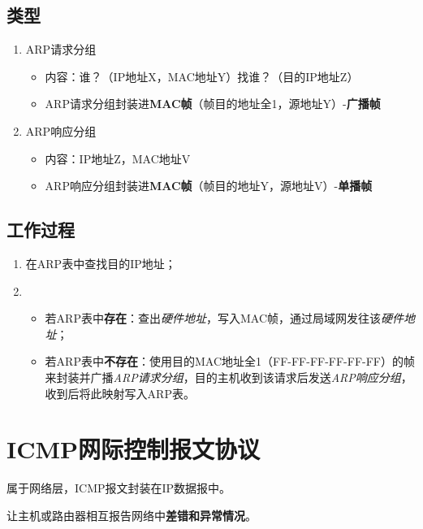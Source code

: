 \subsection{类型}
\begin{enumerate}
    \item ARP请求分组\begin{itemize}
        \item 内容：谁？（IP地址X，MAC地址Y）找谁？（目的IP地址Z）
        \item ARP请求分组封装进\textbf{MAC帧}（帧目的地址全1，源地址Y）-\textbf{广播帧}
    \end{itemize}
    \item ARP响应分组\begin{itemize}
        \item 内容：IP地址Z，MAC地址V
        \item ARP响应分组封装进\textbf{MAC帧}（帧目的地址Y，源地址V）-\textbf{单播帧}
    \end{itemize}
\end{enumerate}


\subsection{工作过程}
\begin{enumerate}
    \item 在ARP表中查找目的IP地址；
    \item \begin{itemize}
        \item 若ARP表中\textbf{存在}：查出\textit{硬件地址}，写入MAC帧，通过局域网发往该\textit{硬件地址}；
        \item 若ARP表中\textbf{不存在}：使用目的MAC地址全1（FF-FF-FF-FF-FF-FF）的帧来封装并广播\textit{ARP请求分组}，目的主机收到该请求后发送\textit{ARP响应分组}，收到后将此映射写入ARP表。
    \end{itemize}
\end{enumerate}


\section{ICMP网际控制报文协议}
属于网络层，ICMP报文封装在IP数据报中。

让主机或路由器相互报告网络中\textbf{差错和异常情况}。

